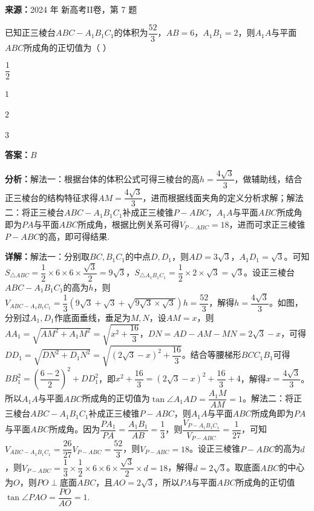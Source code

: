 \begin{question}[points=5]
\textbf{来源：}2024 年 新高考II卷，第 7 题\par
已知正三棱台$ABC-A_1B_1C_1$的体积为$\dfrac{52}{3}$，$AB=6$，$A_1B_1=2$，则$A_1A$与平面$ABC$所成角的正切值为（ ）
\begin{choices}
  \item $\dfrac{1}{2}$
  \item $1$
  \item $2$
  \item $3$
\end{choices}
\begin{solution}
\textbf{答案：}$B$

\textbf{分析：}解法一：根据台体的体积公式可得三棱台的高$h=\dfrac{4\sqrt{3}}{3}$，做辅助线，结合正三棱台的结构特征求得$AM=\dfrac{4\sqrt{3}}{3}$，进而根据线面夹角的定义分析求解；解法二：将正三棱台$ABC-A_1B_1C_1$补成正三棱锥$P-ABC$，$A_1A$与平面$ABC$所成角即为$PA$与平面$ABC$所成角，根据比例关系可得$V_{P-ABC}=18$，进而可求正三棱锥$P-ABC$的高，即可得结果.

\textbf{详解：}解法一：分别取$BC,B_1C_1$的中点$D,D_1$，则$AD=3\sqrt{3}$，$A_1D_1=\sqrt{3}$。可知$S_{\triangle ABC}=\dfrac{1}{2}\times6\times6\times\dfrac{\sqrt{3}}{2}=9\sqrt{3}$，$S_{\triangle A_1B_1C_1}=\dfrac{1}{2}\times2\times\sqrt{3}=\sqrt{3}$。设正三棱台$ABC-A_1B_1C_1$的高为$h$，则$V_{ABC-A_1B_1C_1}=\dfrac{1}{3}(9\sqrt{3}+\sqrt{3}+\sqrt{9\sqrt{3}\times\sqrt{3}})h=\dfrac{52}{3}$，解得$h=\dfrac{4\sqrt{3}}{3}$。如图，分别过$A_1,D_1$作底面垂线，垂足为$M,N$，设$AM=x$，则$AA_1=\sqrt{AM^2+A_1M^2}=\sqrt{x^2+\dfrac{16}{3}}$，$DN=AD-AM-MN=2\sqrt{3}-x$，可得$DD_1=\sqrt{DN^2+D_1N^2}=\sqrt{(2\sqrt{3}-x)^2+\dfrac{16}{3}}$。结合等腰梯形$BCC_1B_1$可得$BB_1^2=\left(\dfrac{6-2}{2}\right)^2+DD_1^2$，即$x^2+\dfrac{16}{3}=(2\sqrt{3}-x)^2+\dfrac{16}{3}+4$，解得$x=\dfrac{4\sqrt{3}}{3}$。所以$A_1A$与平面$ABC$所成角的正切值为$\tan\angle A_1AD=\dfrac{A_1M}{AM}=1$。解法二：将正三棱台$ABC-A_1B_1C_1$补成正三棱锥$P-ABC$，则$A_1A$与平面$ABC$所成角即为$PA$与平面$ABC$所成角。因为$\dfrac{PA_1}{PA}=\dfrac{A_1B_1}{AB}=\dfrac{1}{3}$，则$\dfrac{V_{P-A_1B_1C_1}}{V_{P-ABC}}=\dfrac{1}{27}$，可知$V_{ABC-A_1B_1C_1}=\dfrac{26}{27}V_{P-ABC}=\dfrac{52}{3}$，则$V_{P-ABC}=18$。设正三棱锥$P-ABC$的高为$d$，则$V_{P-ABC}=\dfrac{1}{3}\times\dfrac{1}{2}\times6\times6\times\dfrac{\sqrt{3}}{2}\times d=18$，解得$d=2\sqrt{3}$。取底面$ABC$的中心为$O$，则$PO\perp$底面$ABC$，且$AO=2\sqrt{3}$，所以$PA$与平面$ABC$所成角的正切值$\tan\angle PAO=\dfrac{PO}{AO}=1$.
\end{solution}
\end{question}

